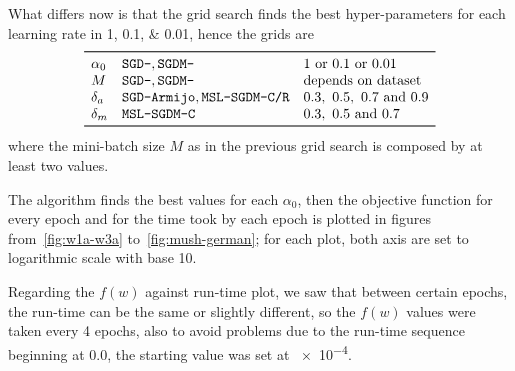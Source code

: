 What differs now is that the grid search finds the best hyper-parameters for each learning rate in \numlist{1; 0.1; 0.01}, hence the grids are
\[
\begin{array}{lll}
\toprule
\alpha_0 & \text{\texttt{SGD-}}, \text{\texttt{SGDM-}} & \text{\numlist[list-separator={ or },list-final-separator={ or }]{1;0.1;0.01}} \\
M & \text{\texttt{SGD-}}, \text{\texttt{SGDM-}} & \text{depends on dataset} \\
\delta_a & \text{\texttt{SGD-Armijo}}, \text{\texttt{MSL-SGDM-C/R}} & \numlist{0.3; 0.5; 0.7; 0.9} \\
\delta_m & \text{\texttt{MSL-SGDM-C}} & \numlist{0.3; 0.5; 0.7} \\
\bottomrule
\end{array}
\]
where the mini-batch size $M$ as in the previous grid search is composed by at least two values.

The algorithm finds the best values for each $\alpha_0$, then the objective function for every epoch and for the time took by each epoch is plotted in figures from~\vref{fig:w1a-w3a} to~\ref{fig:mush-german}; for each plot, both axis are set to logarithmic scale with base 10.

Regarding the $f(w)$ against run-time plot, we saw that between certain epochs, the run-time can be the same or slightly different, so the $f(w)$ values were taken every 4 epochs, also to avoid problems due to the run-time sequence beginning at \num{0.0}, the starting value was set at \num{e-4}.\par\smallskip



